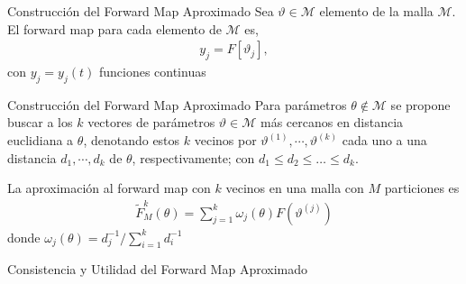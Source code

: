\documentclass[10pt,aspectratio=169]{beamer}
\begin{document}
\begin{frame}{Construcción del Forward Map Aproximado}
  Sea $\vartheta \in \mathcal{M} $ elemento de la malla $\mathcal{M}$. El forward map para cada elemento de $\mathcal{M}$ es, 
  \begin{align*}
    y_j = F[\vartheta_j],
  \end{align*}
  con $y_j = y_j(t)$ funciones continuas
  
  
\end{frame}

\begin{frame}{Construcción del Forward Map Aproximado}
  Para parámetros $\theta \notin \mathcal{M}$ se propone buscar a los $k$ vectores de parámetros $\vartheta \in \mathcal{M}$ más cercanos en distancia euclidiana a $\theta$, denotando estos $k$ vecinos por $\vartheta^{(1)}, \cdots, \vartheta^{(k)}$ cada uno a una distancia $d_1, \cdots, d_k$ de $\theta$, respectivamente; con $d_1 \leq d_2 \leq \dots \leq d_k$. 
  
  \vspace{0.5 cm}

  La aproximación al forward map con $k$ vecinos en una malla con $M$ particiones es
  \begin{align}
    \tilde{F}^{k}_M(\theta) = \sum_{j = 1}^{k} \omega_j(\theta) F \left(\vartheta^{(j)}\right)
    \label{2.4.01}
  \end{align}
  donde $\omega_j(\theta) = d_j^{-1}/ \sum_{i=1}^{k} d_i^{-1}$
\end{frame}

\begin{frame}{Consistencia y Utilidad del Forward Map Aproximado}
  
\end{frame}





















\begin{frame}
  
\end{frame}

\begin{frame}
  
\end{frame}
\end{document}

